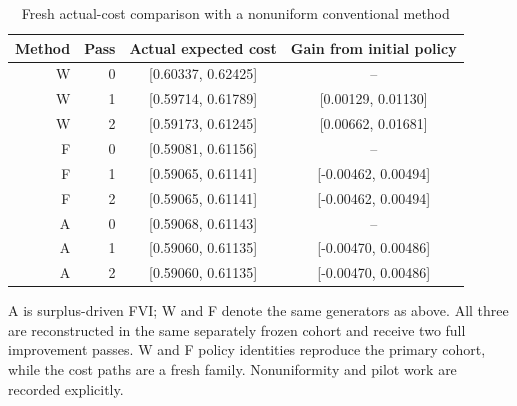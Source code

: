 \begin{table}[htbp]
\centering
\caption{Fresh actual-cost comparison with a nonuniform conventional method}\label{tab:adaptive54}
{\small\setlength{\tabcolsep}{4pt}
\begin{tabular}{rrcc}
\hline
Method & Pass & Actual expected cost & Gain from initial policy \\
\hline
W & 0 & [0.60337, 0.62425] & -- \\
W & 1 & [0.59714, 0.61789] & [0.00129, 0.01130] \\
W & 2 & [0.59173, 0.61245] & [0.00662, 0.01681] \\
F & 0 & [0.59081, 0.61156] & -- \\
F & 1 & [0.59065, 0.61141] & [-0.00462, 0.00494] \\
F & 2 & [0.59065, 0.61141] & [-0.00462, 0.00494] \\
A & 0 & [0.59068, 0.61143] & -- \\
A & 1 & [0.59060, 0.61135] & [-0.00470, 0.00486] \\
A & 2 & [0.59060, 0.61135] & [-0.00470, 0.00486] \\
\hline
\end{tabular}}
\par\smallskip
{\footnotesize A is surplus-driven FVI; W and F denote the same generators as above. All three are reconstructed in the same separately frozen cohort and receive two full improvement passes. W and F policy identities reproduce the primary cohort, while the cost paths are a fresh family. Nonuniformity and pilot work are recorded explicitly.}
\end{table}
